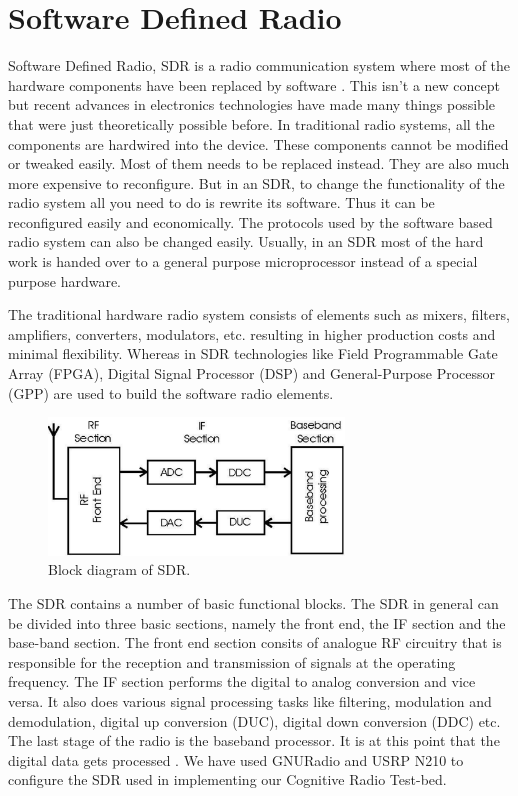 \chapter{Software Defined Radio}

Software Defined Radio, SDR is a radio communication system where most of the 
hardware components have been replaced by software \cite{wikiSDR}. This isn't
a new concept but recent advances in electronics technologies have made many
things possible that were just theoretically possible before. In traditional
radio systems, all the components are hardwired into the device. These 
components cannot be modified or tweaked easily. Most of them needs to be 
replaced instead. They are also much more expensive to reconfigure. But in an
SDR, to change the functionality of the radio system all you need to do is
rewrite its software. Thus it can be reconfigured easily and economically.
The protocols used by the software based radio system can also be changed
easily. Usually, in an SDR most of the hard work is handed over to a general
purpose microprocessor instead of a special purpose hardware.

The traditional hardware radio system consists of elements such as mixers, 
filters, amplifiers, converters, modulators, etc. resulting in higher 
production costs and minimal flexibility. Whereas in SDR technologies like 
Field Programmable Gate Array (FPGA), Digital Signal Processor (DSP) and 
General-Purpose Processor (GPP) are used to build the software radio elements.


\begin{figure}
  \centering
  \includegraphics[width=0.7\textwidth]{../images/sdrBlock}
  \caption{Block diagram of SDR.}
  \label{sdrBlock}
\end{figure}

The SDR contains a number of basic functional blocks.
The SDR in general can be divided into three basic sections, namely the front
end, the IF section and the base-band section. The front end section consits 
of analogue RF circuitry that is responsible for the reception and 
transmission of signals at the operating frequency. The IF section performs
the digital to analog conversion and vice versa. It also does various signal 
processing tasks like filtering, modulation and demodulation, digital up 
conversion (DUC), digital down conversion (DDC) etc. The last stage of the 
radio is the baseband processor. It is at this point that the digital data 
gets processed \cite{miller08}\cite{kranthi13}.
We have used GNURadio and USRP N210 to configure the SDR used in implementing
our Cognitive Radio Test-bed. 

